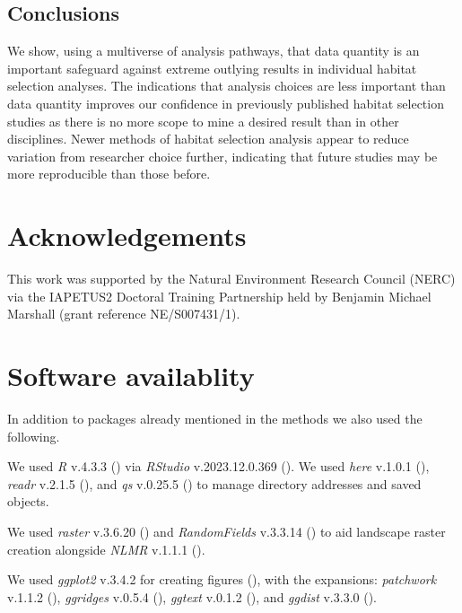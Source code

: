 \documentclass[10pt,a4paper]{article}
\begin{document}
\subsection{Conclusions}\label{conclusions}

We show, using a multiverse of analysis pathways, that data quantity is an important safeguard against extreme outlying results in individual habitat selection analyses.
The indications that analysis choices are less important than data quantity improves our confidence in previously published habitat selection studies as there is no more scope to mine a desired result than in other disciplines.
Newer methods of habitat selection analysis appear to reduce variation from researcher choice further, indicating that future studies may be more reproducible than those before.

\clearpage

\section{Acknowledgements}\label{acknowledgements}

This work was supported by the Natural Environment Research Council (NERC) via the IAPETUS2 Doctoral Training Partnership held by Benjamin Michael Marshall (grant reference NE/S007431/1).

\section{Software availablity}\label{software-availablity}

In addition to packages already mentioned in the methods we also used the following.

We used \emph{R} v.4.3.3 () via \emph{RStudio} v.2023.12.0.369 ().
We used \emph{here} v.1.0.1 (), \emph{readr} v.2.1.5 (), and \emph{qs} v.0.25.5 () to manage directory addresses and saved objects.

We used \emph{raster} v.3.6.20 () and \emph{RandomFields} v.3.3.14 () to aid landscape raster creation alongside \emph{NLMR} v.1.1.1 ().

We used \emph{ggplot2} v.3.4.2 for creating figures (), with the expansions: \emph{patchwork} v.1.1.2 (), \emph{ggridges} v.0.5.4 (), \emph{ggtext} v.0.1.2 (), and \emph{ggdist} v.3.3.0 ().
\end{document}
